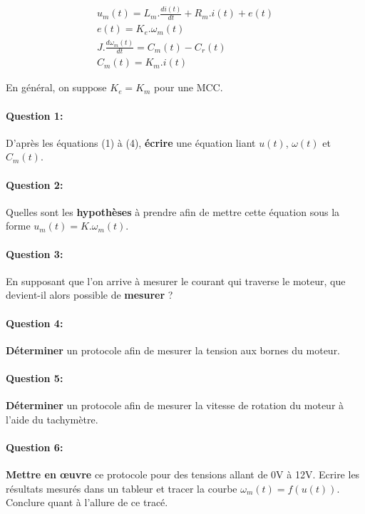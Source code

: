 




\begin{eqnarray}
u_m(t)=L_m.\frac{di(t)}{dt}+R_m.i(t)+e(t) \\
e(t)=K_e.\omega_m(t) \\
J.\frac{d\omega_m(t)}{dt}=C_m(t)-C_r(t) \\
C_m(t)=K_m.i(t)
\end{eqnarray}

En général, on suppose $K_e=K_m$ pour une MCC.

\paragraph{Question 1:} D'après les équations (1) à (4), \textbf{écrire} une équation liant $u(t)$, $\omega(t)$ et $C_m(t)$.

\paragraph{Question 2:} Quelles sont les \textbf{hypothèses} à prendre afin de mettre cette équation sous la forme $u_m(t)=K.\omega_m(t)$.

\paragraph{Question 3:} En supposant que l'on arrive à mesurer le courant qui traverse le moteur, que devient-il alors possible de \textbf{mesurer} ?


\paragraph{Question 4:} \textbf{Déterminer} un protocole afin de mesurer la tension aux bornes du moteur.

\paragraph{Question 5:} \textbf{Déterminer} un protocole afin de mesurer la vitesse de rotation du moteur à l'aide du tachymètre.

\paragraph{Question 6:} \textbf{Mettre en \oe uvre} ce protocole pour des tensions allant de 0V à 12V. Ecrire les résultats mesurés dans un tableur et tracer la courbe $\omega_m(t)=f(u(t))$. Conclure quant à l'allure de ce tracé.

